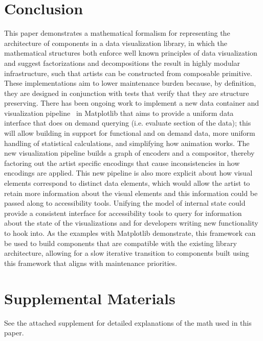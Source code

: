 \documentclass{vgtc}
\theoremstyle{definition}
\theoremstyle{remark}
\begin{document}
\section{Conclusion}
This paper demonstrates a mathematical formalism for representing the architecture of components in a data visualization library, in which the mathematical structures both enforce well known principles of data visualization and suggest factorizations and decompositions the result in highly modular infrastructure, such that artists can be constructed from composable primitive. These implementations aim to lower maintenance burden because, by definition, they are designed in conjunction with tests that verify that they are structure preserving. There has been ongoing work to implement a new data container and visualization pipeline~\cite{kylesundenDynamicDataMatplotlib,hannahaizenmanRedesigningMatplotlibsData2020} in Matplotlib that aims to provide a uniform data interface that does on demand querying (i.e. evaluate section of the data); this will allow building in support for functional and on demand data, more uniform handling of statistical calculations, and simplifying how animation works. The new visualization pipeline builds a graph of encoders and a compositor, thereby factoring out the artist specific encodings that cause inconsistencies in how encodings are applied. This new pipeline is also more explicit about how visual elements correspond to distinct data elements, which would allow the artist to retain more information about the visual elements and this information could be passed along to accessibility tools.  Unifying the model of internal state could provide a consistent interface for accessibility tools to query for information about the state of the visualizations and for developers writing new functionality to hook into. As the examples with Matplotlib demonstrate, this framework can be used to build components that are compatible with the existing library architecture, allowing for a slow iterative transition to components built using this framework that aligns with maintenance priorities. 

\section*{Supplemental Materials}
\label{sec:supplemental_materials}
See the attached supplement for detailed explanations of the math used in this paper.  

\end{document}
